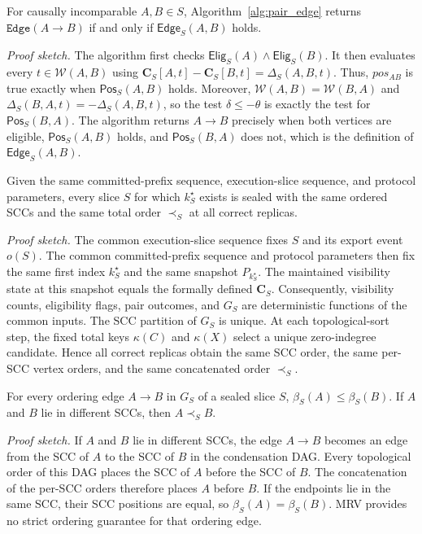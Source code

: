 \begin{lemma}
\label{lem:comparator_correctness}
For causally incomparable $A,B\in S$, Algorithm~\ref{alg:pair_edge} returns $\mathtt{Edge}(A\to B)$ if and only if $\mathsf{Edge}_S(A,B)$ holds.
\end{lemma}
\noindent\emph{Proof sketch.}
The algorithm first checks $\mathsf{Elig}_S(A)\land\mathsf{Elig}_S(B)$.
It then evaluates every $t\in\mathcal{W}(A,B)$ using
$\mathbf{C}_S[A,t]-\mathbf{C}_S[B,t]
=\Delta_S(A,B,t)$.
Thus, $pos_{AB}$ is true exactly when $\mathsf{Pos}_S(A,B)$ holds. Moreover, $\mathcal{W}(A,B)=\mathcal{W}(B,A)$ and $\Delta_S(B,A,t)=-\Delta_S(A,B,t)$, so the test $\delta\leq-\theta$ is exactly the test for $\mathsf{Pos}_S(B,A)$. The algorithm returns $A\to B$ precisely when both vertices are eligible, $\mathsf{Pos}_S(A,B)$ holds, and $\mathsf{Pos}_S(B,A)$ does not, which is the definition of $\mathsf{Edge}_S(A,B)$.

\begin{theorem}
\label{thm:deterministic_slice_ordering}
Given the same committed-prefix sequence, execution-slice sequence, and protocol parameters, every slice $S$ for which $k^\star_S$ exists is sealed with the same ordered SCCs and the same total order $\prec_S$ at all correct replicas.
\end{theorem}
\noindent\emph{Proof sketch.}
The common execution-slice sequence fixes $S$ and its export event $o(S)$. The common committed-prefix sequence and protocol parameters then fix the same first index $k^\star_S$ and the same snapshot $P_{k^\star_S}$. The maintained visibility state at this snapshot equals the formally defined $\mathbf{C}_S$. Consequently, visibility counts, eligibility flags, pair outcomes, and $G_S$ are deterministic functions of the common inputs. The SCC partition of $G_S$ is unique. At each topological-sort step, the fixed total keys $\kappa(C)$ and $\kappa(X)$ select a unique zero-indegree candidate.
Hence all correct replicas obtain the same SCC order, the same per-SCC vertex orders, and the same concatenated order $\prec_S$.

\begin{theorem}
\label{thm:ordering_edges_scc_order}
For every ordering edge $A\to B$ in $G_S$ of a sealed slice $S$,
$\beta_S(A)\leq\beta_S(B)$. If $A$ and $B$ lie in different SCCs, then $A\prec_S B$.
\end{theorem}
\noindent\emph{Proof sketch.}
If $A$ and $B$ lie in different SCCs, the edge $A\to B$ becomes an edge from the SCC of $A$ to the SCC of $B$ in the condensation DAG. Every topological order of this DAG places the SCC of $A$ before the SCC of $B$. The concatenation of the per-SCC orders therefore places $A$ before $B$. If the endpoints lie in the same SCC, their SCC positions are equal, so $\beta_S(A)=\beta_S(B)$. MRV provides no strict ordering guarantee for that ordering edge.

